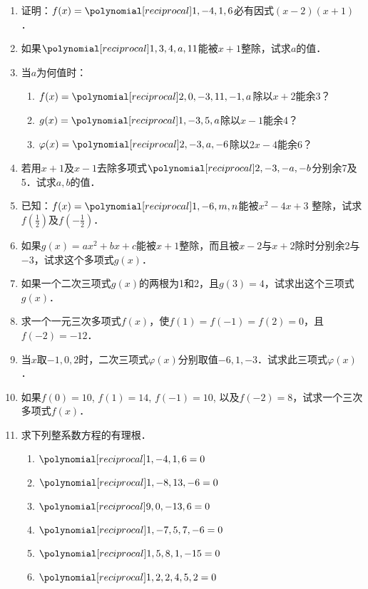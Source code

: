 \begin{enumerate}
\item 证明：$f(x)=\poly{1,-4,1,6}$必有因式$(x-2)(x+1)$．
\item 如果$\poly{1,3,4,a,11}$能被$x+1$整除，试求$a$的值．
\item 当$a$为何值时：
\begin{enumerate}
    \item $f(x)=\poly{2,0,-3,11,-1,a}$除以$x+2$能余3？
    \item $g(x)=\poly{1,-3,5,a}$除以$x-1$能余4？
    \item $\varphi(x)=\poly{2,-3,a,-6}$除以$2x-4$能余6？
\end{enumerate}

\item 若用$x+1$及$x-1$去除多项式$\poly{2,-3,-a,-b}$分别余7及5．试求$a,b$的值．

\item 已知：$f(x)=\poly{1,-6,m,n}$能被$x^2-4x+3$
整除，试求$f\left(\frac{1}{2}\right)$及$f\left(-\frac{1}{2}\right)$．

\item 如果$g(x)=ax^2+bx+c$能被$x+1$整除，而且被$x-2$与$x+2$除时分别余2与$-3$，试求这个多项式$g(x)$．

\item 如果一个二次三项式$g(x)$的两根为1和2，且$g(3)=4$，试求出这个三项式$g(x)$．

\item 求一个一元三次多项式$f(x)$，使$f(1)=f(-1)=f(2)=0$，且$f(-2)=-12$．
\item 当$x$取$-1, 0, 2$时，二次三项式$\varphi(x)$分别取值$-6,1,-3$．试求此三项式$\varphi(x)$．
\item 如果$f(0)=10$, $f(1)=14$, $f(-1)=10$, 以及$f(-2)=8$，试求一个三次多项式$f(x)$．

\item 求下列整系数方程的有理根．
\begin{multicols}{2}
    \begin{enumerate}
    \item $\poly{1,-4,1,6}=0$
    \item $\poly{1,-8,13,-6}=0$
    \item $\poly{9,0,-13,6}=0$
    \item $\poly{1,-7,5,7,-6}=0$
    \item $\poly{1,5,8,1,-15}=0$
    \item $\poly{1,2,2,4,5,2}=0$
\end{enumerate}
\end{multicols}


\end{enumerate}
